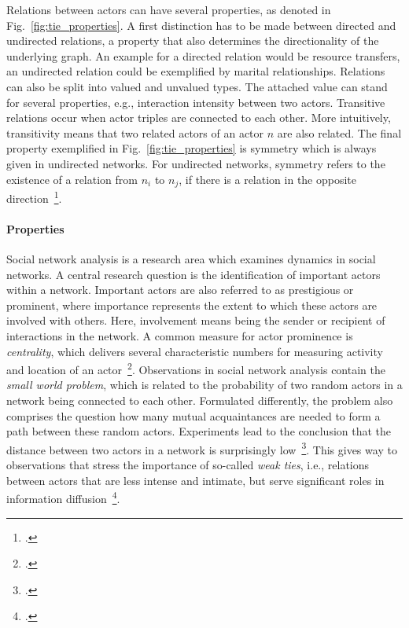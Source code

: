 Relations between actors can have several properties, as denoted in Fig.~\ref{fig:tie_properties}.
A first distinction has to be made between directed and undirected relations,
a property that also determines the directionality of the underlying graph.
An example for a directed relation would be resource transfers, an undirected
relation could be exemplified by marital relationships.
Relations can also be split into valued and unvalued types.
The attached value can stand for several properties, e.g., interaction intensity
between two actors.
Transitive relations occur when actor triples are connected to each other.
More intuitively, transitivity means that two related actors of an actor $n$ are
also related.
The final property exemplified in Fig.~\ref{fig:tie_properties} is symmetry which
is always given in undirected networks.
For undirected networks, symmetry refers to the existence of a relation from
$n_i$ to $n_j$, if there is a relation in the opposite direction~\footcite{Wasserman1994}.

\paragraph{Properties}

Social network analysis is a research area which examines dynamics in social
networks.
A central research question is the identification of important actors within
a network.
Important actors are also referred to as prestigious or prominent, where importance
represents the extent to which these actors are involved with others.
Here, involvement means being the sender or recipient of interactions in the
network.
A common measure for actor prominence is \textit{centrality}, which delivers
several characteristic numbers for measuring activity and location of an actor~\footcite{Wasserman1994}.
Observations in social network analysis contain the \textit{small world problem},
which is related to the probability of two random actors in a network being
connected to each other.
Formulated differently, the problem also comprises the question how many
mutual acquaintances are needed to form a path between these random actors.
Experiments lead to the conclusion that the distance between two actors in
a network is surprisingly low~\footcite{Travers1969}.
This gives way to observations that stress the importance of so-called
\textit{weak ties}, i.e., relations between actors that are less intense and
intimate, but serve significant roles in information diffusion~\footcite{Granovetter1973}.

